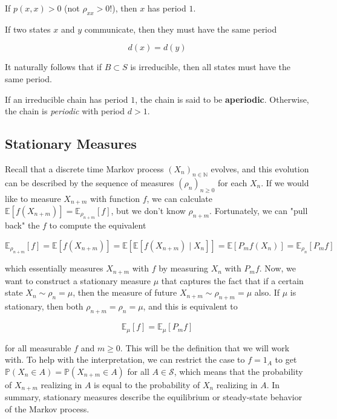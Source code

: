\documentclass{article}
\begin{document}
      \begin{lemma}
        If $p(x, x) > 0$ (not $\rho_{xx} > 0$!), then $x$ has period $1$. 
      \end{lemma}

      \begin{theorem}
        If two states $x$ and $y$ communicate, then they must have the same period

          \[d(x) = d(y)\]

        It naturally follows that if $B \subset S$ is irreducible, then all states must have the same period. 
      \end{theorem}

      \begin{definition}
        If an irreducible chain has period $1$, the chain is said to be \textbf{aperiodic}. Otherwise, the chain is \textit{periodic} with period $d > 1$. 
      \end{definition}

  \subsection{Stationary Measures}

    Recall that a discrete time Markov process $(X_n)_{n \in \mathbb{N}}$ evolves, and this evolution can be described by the sequence of measures $(\rho_n)_{n \geq 0}$ for each $X_n$. If we would like to measure $X_{n + m}$ with function $f$, we can calculate $\mathbb{E}[f(X_{n + m})] = \mathbb{E}_{\rho_{n + m}} [f]$, but we don't know $\rho_{n + m}$. Fortunately, we can "pull back" the $f$ to compute the equivalent 

      \[\mathbb{E}_{\rho_{n + m}} [f] = \mathbb{E}[f(X_{n + m})] = \mathbb{E}[\mathbb{E}[ f(X_{n + m}) \mid X_n]] = \mathbb{E}[P_m f (X_n)] = \mathbb{E}_{\rho_{n}} [ P_m f] \]

    which essentially measures $X_{n + m}$ with $f$ by measuring $X_n$ with $P_m f$. Now, we want to construct a stationary measure $\mu$ that captures the fact that if a certain state $X_n \sim \rho_n = \mu$, then the measure of future $X_{n + m} \sim \rho_{n + m} = \mu$ also. If $\mu$ is stationary, then both $\rho_{n + m} = \rho_n = \mu$, and this is equivalent to

      \[\mathbb{E}_\mu [f] = \mathbb{E}_\mu [P_m f]\]

    for all measurable $f$ and $m \geq 0$. This will be the definition that we will work with. To help with the interpretation, we can restrict the case to $f = 1_A$ to get $\mathbb{P}(X_n \in A) = \mathbb{P}(X_{n + m} \in A)$ for all $A \in \mathcal{S}$, which means that the probability of $X_{n + m}$ realizing in $A$ is equal to the probability of $X_n$ realizing in $A$. In summary, stationary measures describe the equilibrium or steady-state behavior of the Markov process.  
\end{document}
